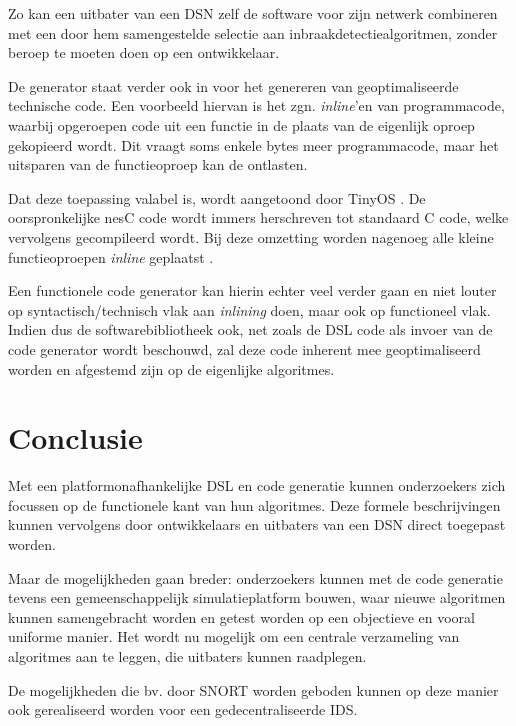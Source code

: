 Zo kan een uitbater van een DSN zelf de software voor zijn netwerk combineren
met een door hem samengestelde selectie aan inbraakdetectiealgoritmen, zonder
beroep te moeten doen op een ontwikkelaar.

De generator staat verder ook in voor het genereren van geoptimaliseerde
technische code. Een voorbeeld hiervan is het zgn. \emph{inline}'en van
programmacode, waarbij opgeroepen code uit een functie in de plaats van de
eigenlijk oproep gekopieerd wordt. Dit vraagt soms enkele bytes meer
programmacode, maar het uitsparen van de functieoproep kan de \mcu ontlasten.

Dat deze toepassing valabel is, wordt aangetoond door TinyOS
\citep{levis2005tinyos}. De oorspronkelijke nesC code wordt immers herschreven
tot standaard C code, welke vervolgens gecompileerd wordt. Bij deze omzetting
worden nagenoeg alle kleine functieoproepen \emph{inline} geplaatst
\citep{gay2007software}.

Een functionele code generator kan hierin echter veel verder gaan en niet
louter op syntactisch/technisch vlak aan \emph{inlining} doen, maar ook op
functioneel vlak. Indien dus de softwarebibliotheek ook, net zoals de DSL code
als invoer van de code generator wordt beschouwd, zal deze code inherent mee
geoptimaliseerd worden en afgestemd zijn op de eigenlijke algoritmes.

\section{Conclusie}
\label{section:solution-conclusion}

Met een platformonafhankelijke DSL en code generatie kunnen onderzoekers zich
focussen op de functionele kant van hun algoritmes. Deze formele beschrijvingen
kunnen vervolgens door ontwikkelaars en uitbaters van een DSN direct
toegepast worden.

Maar de mogelijkheden gaan breder: onderzoekers kunnen met de code generatie
tevens een gemeenschappelijk simulatieplatform bouwen, waar nieuwe algoritmen
kunnen samengebracht worden en getest worden op een objectieve en vooral
uniforme manier. Het wordt nu mogelijk om een centrale verzameling van
algoritmes aan te leggen, die uitbaters kunnen raadplegen.

De mogelijkheden die bv. door SNORT worden geboden kunnen op deze manier ook
gerealiseerd worden voor een gedecentraliseerde IDS.
